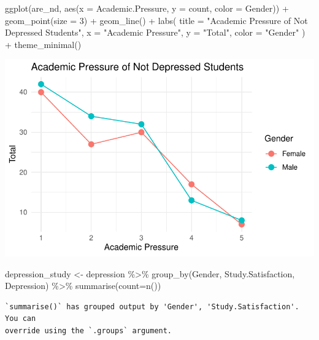 \documentclass[
  letterpaper,
  DIV=11,
  numbers=noendperiod]{scrartcl}
\newenvironment{Shaded}{\begin{snugshade}}{\end{snugshade}}
\newcommand{\AttributeTok}[1]{\textcolor[rgb]{0.40,0.45,0.13}{#1}}
\newcommand{\DecValTok}[1]{\textcolor[rgb]{0.68,0.00,0.00}{#1}}
\newcommand{\FunctionTok}[1]{\textcolor[rgb]{0.28,0.35,0.67}{#1}}
\newcommand{\NormalTok}[1]{\textcolor[rgb]{0.00,0.23,0.31}{#1}}
\newcommand{\OtherTok}[1]{\textcolor[rgb]{0.00,0.23,0.31}{#1}}
\newcommand{\SpecialCharTok}[1]{\textcolor[rgb]{0.37,0.37,0.37}{#1}}
\newcommand{\StringTok}[1]{\textcolor[rgb]{0.13,0.47,0.30}{#1}}
\begin{document}
\begin{Shaded}
\begin{Highlighting}[]
\FunctionTok{ggplot}\NormalTok{(are\_nd, }\FunctionTok{aes}\NormalTok{(}\AttributeTok{x =}\NormalTok{ Academic.Pressure, }\AttributeTok{y =}\NormalTok{ count, }\AttributeTok{color =}\NormalTok{ Gender)) }\SpecialCharTok{+}
  \FunctionTok{geom\_point}\NormalTok{(}\AttributeTok{size =} \DecValTok{3}\NormalTok{) }\SpecialCharTok{+}    
  \FunctionTok{geom\_line}\NormalTok{() }\SpecialCharTok{+}       
  \FunctionTok{labs}\NormalTok{(}
    \AttributeTok{title =} \StringTok{"Academic Pressure of Not Depressed Students"}\NormalTok{,}
    \AttributeTok{x =} \StringTok{"Academic Pressure"}\NormalTok{,}
    \AttributeTok{y =} \StringTok{"Total"}\NormalTok{,}
    \AttributeTok{color =} \StringTok{"Gender"}
\NormalTok{  ) }\SpecialCharTok{+}
  \FunctionTok{theme\_minimal}\NormalTok{() }
\end{Highlighting}
\end{Shaded}

\includegraphics{Data_files/figure-pdf/unnamed-chunk-4-2.pdf}

\begin{Shaded}
\begin{Highlighting}[]
\NormalTok{depression\_study }\OtherTok{\textless{}{-}}\NormalTok{ depression }\SpecialCharTok{\%\textgreater{}\%} \FunctionTok{group\_by}\NormalTok{(Gender, Study.Satisfaction, Depression) }\SpecialCharTok{\%\textgreater{}\%} \FunctionTok{summarise}\NormalTok{(}\AttributeTok{count=}\FunctionTok{n}\NormalTok{())}
\end{Highlighting}
\end{Shaded}

\begin{verbatim}
`summarise()` has grouped output by 'Gender', 'Study.Satisfaction'. You can
override using the `.groups` argument.
\end{verbatim}
\end{document}

